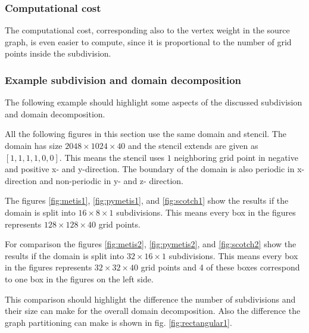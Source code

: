 \subsubsection{Computational cost}

The computational cost, corresponding also to the vertex weight in the source graph, is even easier to compute, since it is proportional to the number of grid points inside the subdivision.

\subsubsection{Example subdivision and domain decomposition}
The following example should highlight some aspects of the discussed subdivision and domain decomposition.

All the following figures in this section use the same domain and stencil.
The domain has size $2048 \times 1024 \times 40$ and the stencil extends are given as $\left[1, 1, 1, 1, 0, 0\right]$.
This means the stencil uses $1$ neighboring grid point in negative and positive x- and y-direction.
The boundary of the domain is also periodic in x-direction and non-periodic in y- and z- direction.

The figures \ref{fig:metis1}, \ref{fig:pymetis1}, and \ref{fig:scotch1} show the results if the domain is split into $16 \times 8 \times 1$ subdivisions.
This means every box in the figures represents $128 \times 128 \times 40$ grid points.

For comparison the figures \ref{fig:metis2}, \ref{fig:pymetis2}, and \ref{fig:scotch2} show the results if the domain is split into $32 \times 16 \times 1$ subdivisions.
This means every box in the figures represents $32 \times 32 \times 40$ grid points and 4 of these boxes correspond to one box in the figures on the left side.

This comparison should highlight the difference the number of subdivisions and their size can make for the overall domain decomposition.
Also the difference the graph partitioning can make is shown in fig. \ref{fig:rectangular1}.


